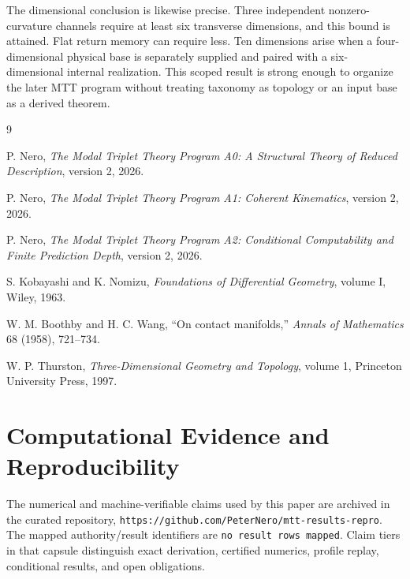 \documentclass[11pt]{article}
\begin{document}
The dimensional conclusion is likewise precise.  Three independent
nonzero-curvature channels require at least six transverse dimensions, and
this bound is attained.  Flat return memory can require less.  Ten dimensions
arise when a four-dimensional physical base is separately supplied and paired
with a six-dimensional internal realization.  This scoped result is strong
enough to organize the later MTT program without treating taxonomy as topology
or an input base as a derived theorem.

\begin{thebibliography}{9}

P. Nero,
\emph{The Modal Triplet Theory Program A0: A Structural Theory of Reduced
Description}, version 2, 2026.

P. Nero,
\emph{The Modal Triplet Theory Program A1: Coherent Kinematics},
version 2, 2026.

P. Nero,
\emph{The Modal Triplet Theory Program A2: Conditional Computability and
Finite Prediction Depth}, version 2, 2026.

S. Kobayashi and K. Nomizu,
\emph{Foundations of Differential Geometry}, volume I,
Wiley, 1963.

W. M. Boothby and H. C. Wang,
``On contact manifolds,''
\emph{Annals of Mathematics} 68 (1958), 721--734.

W. P. Thurston,
\emph{Three-Dimensional Geometry and Topology}, volume 1,
Princeton University Press, 1997.

\end{thebibliography}

\section*{Computational Evidence and Reproducibility}
The numerical and machine-verifiable claims used by this paper are archived in the curated repository, \texttt{https://github.com/PeterNero/mtt-results-repro}. The mapped authority/result identifiers are \texttt{no result rows mapped}. Claim tiers in that capsule distinguish exact derivation, certified numerics, profile replay, conditional results, and open obligations.
\end{document}
